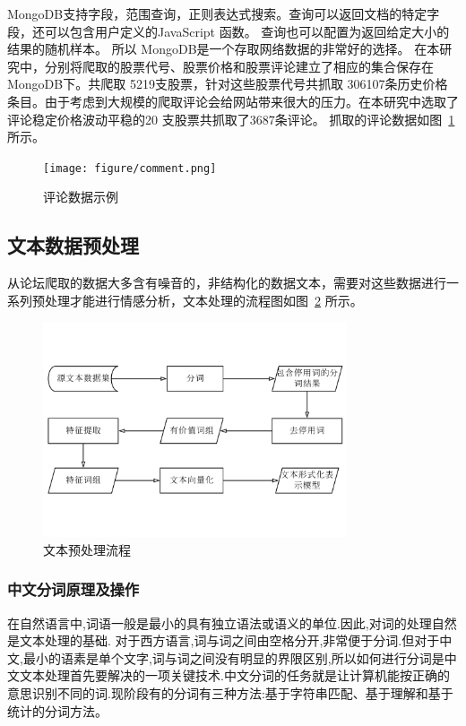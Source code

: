 \documentclass[cs4size,a4paper]{ctexart}
\numberwithin{equation}{section}
\numberwithin{table}{section}
\numberwithin{figure}{section}
\begin{document}
MongoDB支持字段，范围查询，正则表达式搜索。查询可以返回文档的特定字段，还可以包含用户定义的JavaScript 函数。
查询也可以配置为返回给定大小的结果的随机样本。
所以 MongoDB是一个存取网络数据的非常好的选择。
在本研究中，分别将爬取的股票代号、股票价格和股票评论建立了相应的集合保存在MongoDB下。共爬取 5219支股票，针对这些股票代号共抓取 306107条历史价格条目。由于考虑到大规模的爬取评论会给网站带来很大的压力。在本研究中选取了评论稳定价格波动平稳的20 支股票共抓取了3687条评论。
抓取的评论数据如图~\ref{fig:comment}所示。

\begin{figure}
  \centering
  \texttt{[image: figure/comment.png]}
  \caption{评论数据示例}\label{fig:comment}
\end{figure}

\subsection{文本数据预处理}

从论坛爬取的数据大多含有噪音的，非结构化的数据文本，需要对这些数据进行一系列预处理才能进行情感分析，文本处理的流程图如图~\ref{fig:textPrecess} 所示。
\begin{figure}
  \centering
  \includegraphics[width=0.8\textwidth]{figure/textPrecess.pdf}
\caption{文本预处理流程}\label{fig:textPrecess}
\end{figure}

\subsubsection{中文分词原理及操作}

在自然语言中,词语一般是最小的具有独立语法或语义的单位.因此,对词的处理自然是文本处理的基础.
对于西方语言,词与词之间由空格分开,非常便于分词.但对于中文,最小的语素是单个文字,词与词之间没有明显的界限区别,所以如何进行分词是中文文本处理首先要解决的一项关键技术.中文分词的任务就是让计算机能按正确的意思识别不同的词.现阶段有的分词有三种方法:基于字符串匹配、基于理解和基于统计的分词方法。
\end{document}
